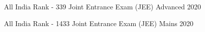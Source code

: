 


\begin{cvhonors}

  \cvhonor
    {All India Rank - 339} %
    {Joint Entrance Exam (JEE) Advanced }  %
    {} %
    {2020} %
    
  \cvhonor
    {All India Rank - 1433} %
    {Joint Entrance Exam (JEE) Mains }  %
    {} %
    {2020} %


\end{cvhonors}

